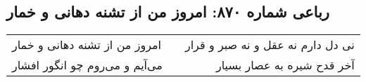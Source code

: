 \begin{center}
\section*{رباعی شماره ۸۷۰: امروز من از تشنه دهانی و خمار}
\label{sec:0870}
\begin{longtable}{l p{0.5cm} r}
امروز من از تشنه دهانی و خمار
&&
نی دل دارم نه عقل و نه صبر و قرار
\\
می‌آیم و می‌روم چو انگور افشار
&&
آخر قدح شیره به عصار بسیار
\\
\end{longtable}
\end{center}
